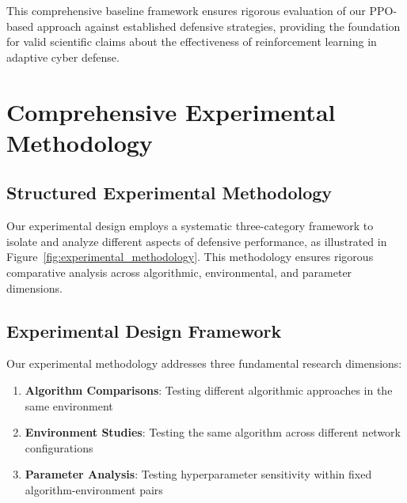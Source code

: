 \documentclass[12pt,oneside]{article}
\begin{document}
This comprehensive baseline framework ensures rigorous evaluation of our PPO-based approach against established defensive strategies, providing the foundation for valid scientific claims about the effectiveness of reinforcement learning in adaptive cyber defense.


\clearpage
\section{Comprehensive Experimental Methodology}

\subsection{Structured Experimental Methodology}

Our experimental design employs a systematic three-category framework to isolate and analyze different aspects of defensive performance, as illustrated in Figure~\ref{fig:experimental_methodology}. This methodology ensures rigorous comparative analysis across algorithmic, environmental, and parameter dimensions.

\subsection{Experimental Design Framework}

Our experimental methodology addresses three fundamental research dimensions:

\begin{enumerate}
\item \textbf{Algorithm Comparisons}: Testing different algorithmic approaches in the same environment
\item \textbf{Environment Studies}: Testing the same algorithm across different network configurations  
\item \textbf{Parameter Analysis}: Testing hyperparameter sensitivity within fixed algorithm-environment pairs
\end{enumerate}
\end{document}
